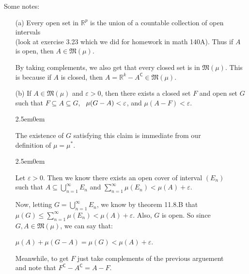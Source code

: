 \documentclass{book}
\newcommand{\hTwo}{%
   \color{MidnightBlue}%
   \fontsize{13}{15}\selectfont%
}
\newcommand{\hThree}{%
   \color{PineGreen!85!Orange}
   \fontsize{13}{15}\selectfont%
}
\newenvironment{myIndent}{%
   \begin{adjustwidth}{2.5em}{0em}%
}{%
   \end{adjustwidth}%
}
\newcommand{\comp}{\mathsf{C}}
\newcommand{\myHS}{ \hspace{0.5em}}
\newcommand{\retTwo}{\hfill\bigbreak}
\begin{document}
Some notes:\\ [-18pt]
\begin{itemize}
   \item[(a)] Every open set in $\mathbb{R}^p$ is the union of a countable collection of open intervals\\ (look at exercise 3.23 which we did for homework in math 140A). Thus if $A$\\ is open, then $A \in \mathfrak{M}(\mu)$.\retTwo
   
   By taking complements, we also get that every closed set is in $\mathfrak{M}(\mu)$. This\\ is because if $A$ is closed, then $A = \mathbb{R}^k - A^\comp \in \mathfrak{M}(\mu)$.\retTwo

   \item[(b)] If $A \in \mathfrak{M}(\mu)$ and $\varepsilon > 0$, then there exists a closed set $F$ and open set $G$\\ such that $F \subseteq A \subseteq G$, $\myHS\mu(G - A) < \varepsilon$, and $\mu(A - F) < \varepsilon$.
   
   \begin{myIndent}\hTwo
      The existence of $G$ satisfying this claim is immediate from our \\definition of $\mu = \mu^*$.
      {\begin{myIndent}\hThree
         Let $\varepsilon > 0$. Then we know there exists an open cover of interval $(E_n)$\\ such that $A \subseteq \bigcup\limits_{n=1}^\infty E_n$ and $\sum\limits_{n=1}^\infty \mu(E_n) < \mu(A) + \varepsilon$.\retTwo

         Now, letting $G = \bigcup\limits_{n=1}^\infty E_n$, we know by theorem 11.8.B that\\ [-6pt] $\mu(G) \leq \sum\limits_{n=1}^\infty \mu(E_n) < \mu(A) + \varepsilon$. Also, $G$ is open. So since\\ [1pt] $G, A \in \mathfrak{M}(\mu)$, we can say that:
         
         {\centering $\mu(A) + \mu(G - A) = \mu(G) < \mu(A) + \varepsilon$.\par}
      \end{myIndent}}

      \newpage

      Meanwhile, to get $F$ just take complements of the previous arguement\\ and note that $F^\comp - A^\comp = A - F$.\retTwo
   \end{myIndent}


\end{itemize}
\end{document}
